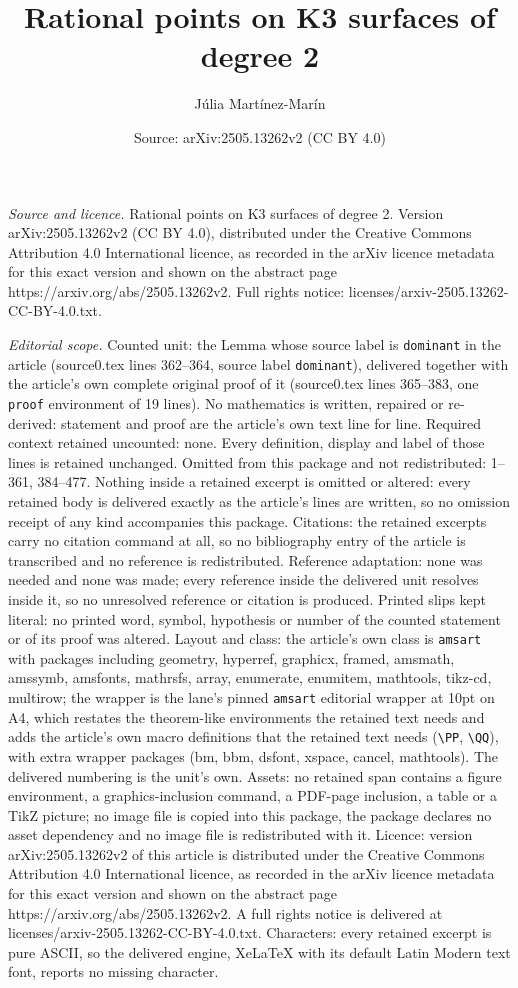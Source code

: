 \documentclass[10pt,a4paper]{amsart}
\title[Rational points on K3 surfaces of degree 2]{Rational points on K3 surfaces of degree 2}
\author{J\'ulia Mart\'inez-Mar\'in}
\date{Source: arXiv:2505.13262v2 (CC BY 4.0)}
\begin{document}
\maketitle

\noindent\emph{Source and licence.} Rational points on K3 surfaces of degree 2. Version arXiv:2505.13262v2 (CC BY 4.0), distributed under the Creative Commons Attribution 4.0 International licence, as recorded in the arXiv licence metadata for this exact version and shown on the abstract page https://arxiv.org/abs/2505.13262v2. Full rights notice: licenses/arxiv-2505.13262-CC-BY-4.0.txt.\par\smallskip

\noindent\textit{Editorial scope.} Counted unit: the Lemma whose source label is \texttt{dominant} in the article (source0.tex lines 362--364, source label \texttt{dominant}), delivered together with the article's own complete original proof of it (source0.tex lines 365--383, one \texttt{proof} environment of 19 lines). No mathematics is written, repaired or re-derived: statement and proof are the article's own text line for line. Required context retained uncounted: none. Every definition, display and label of those lines is retained unchanged. Omitted from this package and not redistributed: 1--361, 384--477. Nothing inside a retained excerpt is omitted or altered: every retained body is delivered exactly as the article's lines are written, so no omission receipt of any kind accompanies this package. Citations: the retained excerpts carry no citation command at all, so no bibliography entry of the article is transcribed and no reference is redistributed. Reference adaptation: none was needed and none was made; every reference inside the delivered unit resolves inside it, so no unresolved reference or citation is produced. Printed slips kept literal: no printed word, symbol, hypothesis or number of the counted statement or of its proof was altered. Layout and class: the article's own class is \texttt{amsart} with packages including geometry, hyperref, graphicx, framed, amsmath, amssymb, amsfonts, mathrsfs, array, enumerate, enumitem, mathtools, tikz-cd, multirow; the wrapper is the lane's pinned \texttt{amsart} editorial wrapper at 10pt on A4, which restates the theorem-like environments the retained text needs and adds the article's own macro definitions that the retained text needs (\texttt{\textbackslash PP}, \texttt{\textbackslash QQ}), with extra wrapper packages (bm, bbm, dsfont, xspace, cancel, mathtools). The delivered numbering is the unit's own. Assets: no retained span contains a figure environment, a graphics-inclusion command, a PDF-page inclusion, a table or a TikZ picture; no image file is copied into this package, the package declares no asset dependency and no image file is redistributed with it. Licence: version arXiv:2505.13262v2 of this article is distributed under the Creative Commons Attribution 4.0 International licence, as recorded in the arXiv licence metadata for this exact version and shown on the abstract page https://arxiv.org/abs/2505.13262v2. A full rights notice is delivered at licenses/arxiv-2505.13262-CC-BY-4.0.txt. Characters: every retained excerpt is pure ASCII, so the delivered engine, XeLaTeX with its default Latin Modern text font, reports no missing character.
\end{document}
